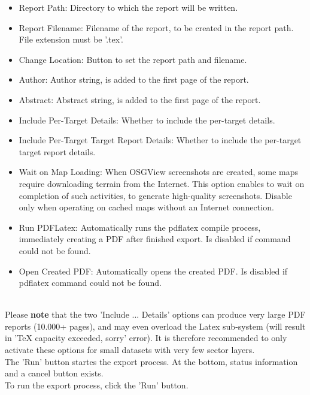 \begin{itemize}  
\item Report Path: Directory to which the report will be written.
\item Report Filename: Filename of the report, to be created in the report path. File extension must be '.tex'.
\item Change Location: Button to set the report path and filename.
\item Author: Author string, is added to the first page of the report.
\item Abstract: Abstract string, is added to the first page of the report.
\item Include Per-Target Details: Whether to include the per-target details.
\item Include Per-Target Target Report Details: Whether to include the per-target target report details.
\item Wait on Map Loading: When OSGView screenshots are created, some maps require downloading terrain from the Internet.  This option enables to wait on completion of such activities, to generate high-quality screenshots. Disable only when operating on cached maps without an Internet connection.
\item Run PDFLatex: Automatically runs the pdflatex compile process, immediately creating a PDF after finished export. Is disabled if command could not be found.
\item Open Created PDF: Automatically opens the created PDF. Is disabled if pdflatex command could not be found.
\end{itemize}
\ \\

Please \textbf{note} that the two 'Include ... Details' options can produce very large PDF reports (10.000+ pages), and may even overload the Latex sub-system (will result in 'TeX capacity exceeded, sorry' error). It is therefore recommended to only activate these options for small datasets with very few sector layers. \\

The 'Run' button startes the export process. At the bottom, status information and a cancel button exists. \\

To run the export process, click the 'Run' button.

